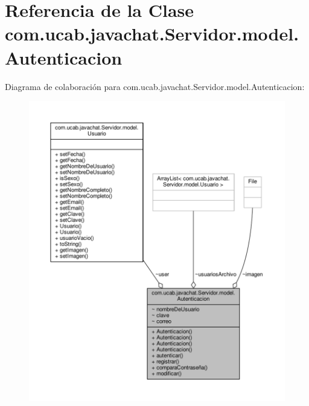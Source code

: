 \hypertarget{classcom_1_1ucab_1_1javachat_1_1_servidor_1_1model_1_1_autenticacion}{\section{Referencia de la Clase com.\-ucab.\-javachat.\-Servidor.\-model.\-Autenticacion}
\label{classcom_1_1ucab_1_1javachat_1_1_servidor_1_1model_1_1_autenticacion}
}


Diagrama de colaboración para com.\-ucab.\-javachat.\-Servidor.\-model.\-Autenticacion\-:\nopagebreak
\begin{figure}[H]
\begin{center}
\leavevmode
\includegraphics[width=350pt]{classcom_1_1ucab_1_1javachat_1_1_servidor_1_1model_1_1_autenticacion__coll__graph}
\end{center}
\end{figure}
